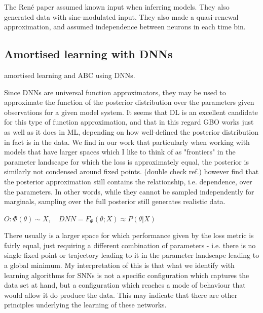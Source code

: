 \documentclass[mphil,deptreport,ianc]{infthesis} %
\begin{document}
The René paper assumed known input when inferring models. They also generated data with sine-modulated input.
They also made a quasi-renewal approximation, and assumed independence between neurons in each time bin.


\subsection{Amortised learning with DNNs}

\cite{Lueckmann2018} amortised learning and ABC using DNNs.

Since DNNs are universal function approximators, they may be used to approximate the function of the posterior distribution over the parameters given observations for a given model system.
It seems that DL is an excellent candidate for this type of function approximation, and that in this regard GBO works just as well as it does in ML, depending on how well-defined the posterior distribution in fact is in the data.
We find in our work that particularly when working with models that have larger spaces which I like to think of as "frontiers" in the parameter landscape for which the loss is approximately equal, the posterior is similarly not condensed around fixed points.
\cite{Lueckmann2021} (double check ref.) however find that the posterior approximation still contains the relationship, i.e. dependence, over the parameters. 
In other words, while they cannot be sampled independently for marginals, sampling over the full posterior still generates realistic data.


\begin{math}
    O: \Phi(\theta) \sim X, \quad
    DNN = F_\Phi(\theta; X) \approx P(\theta|X)
\end{math}

There usually is a larger space for which performance given by the loss metric is fairly equal, just requiring a different combination of parameters - i.e. there is no single fixed point or trajectory leading to it in the parameter landscape leading to a global minimum.
My interpretation of this is that what we identify with learning algorithms for SNNs is not a specific configuration which captures the data set at hand, but a configuration which reaches a mode of behaviour that would allow it do produce the data.
This may indicate that there are other principles underlying the learning of these networks.
\end{document}
